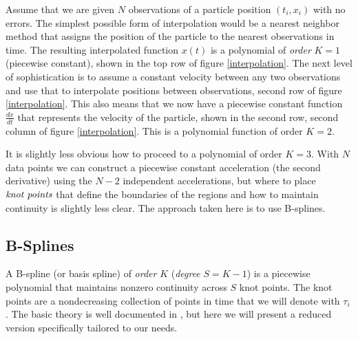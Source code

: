 \documentclass[twocol]{ametsoc}
\begin{document}
Assume that we are given $N$ observations of a particle position $(t_i,x_i)$ with no errors. The simplest possible form of interpolation would be a nearest neighbor method that assigns the position of the particle to the nearest observations in time. The resulting interpolated function $x(t)$ is a polynomial of \emph{order} $K=1$ (piecewise constant), shown in the top row of figure \ref{interpolation}. The next level of sophistication is to assume a constant velocity between any two observations and use that to interpolate positions between observations, second row of figure \ref{interpolation}. This also means that we now have a piecewise constant function $\frac{dx}{dt}$ that represents the velocity of the particle, shown in the second row, second column of figure  \ref{interpolation}. This is a polynomial function of order $K=2$.

It is slightly less obvious how to proceed to a polynomial of order $K=3$. With $N$ data points we can construct a piecewise constant acceleration (the second derivative) using the $N-2$ independent accelerations, but where to place $\emph{knot points}$ that define the boundaries of the regions and how to maintain continuity is slightly less clear. The approach taken here is to use B-splines.

\subsection{B-Splines}

A B-spline (or basis spline) of \emph{order} $K$ (\emph{degree} $S=K-1$) is a piecewise polynomial that maintains nonzero continuity across $S$ knot points. The knot points are a nondecreasing collection of points in time that we will denote with $\tau_i$. The basic theory is well documented in \citet{deboor1978-book}, but here we will present a reduced version specifically tailored to our needs.
\end{document}
